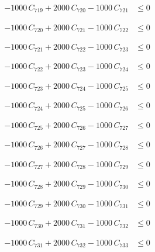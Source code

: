 \documentclass[a4paper,11pt]{article}
\begin{document}
\begin{align}
-1000\,C_{719} + 2000\,C_{720} - 1000\,C_{721} &\leq 0 \nonumber
\end{align}

\begin{align}
-1000\,C_{720} + 2000\,C_{721} - 1000\,C_{722} &\leq 0 \nonumber
\end{align}

\begin{align}
-1000\,C_{721} + 2000\,C_{722} - 1000\,C_{723} &\leq 0 \nonumber
\end{align}

\begin{align}
-1000\,C_{722} + 2000\,C_{723} - 1000\,C_{724} &\leq 0 \nonumber
\end{align}

\begin{align}
-1000\,C_{723} + 2000\,C_{724} - 1000\,C_{725} &\leq 0 \nonumber
\end{align}

\begin{align}
-1000\,C_{724} + 2000\,C_{725} - 1000\,C_{726} &\leq 0 \nonumber
\end{align}

\begin{align}
-1000\,C_{725} + 2000\,C_{726} - 1000\,C_{727} &\leq 0 \nonumber
\end{align}

\begin{align}
-1000\,C_{726} + 2000\,C_{727} - 1000\,C_{728} &\leq 0 \nonumber
\end{align}

\begin{align}
-1000\,C_{727} + 2000\,C_{728} - 1000\,C_{729} &\leq 0 \nonumber
\end{align}

\begin{align}
-1000\,C_{728} + 2000\,C_{729} - 1000\,C_{730} &\leq 0 \nonumber
\end{align}

\begin{align}
-1000\,C_{729} + 2000\,C_{730} - 1000\,C_{731} &\leq 0 \nonumber
\end{align}

\begin{align}
-1000\,C_{730} + 2000\,C_{731} - 1000\,C_{732} &\leq 0 \nonumber
\end{align}

\begin{align}
-1000\,C_{731} + 2000\,C_{732} - 1000\,C_{733} &\leq 0 \nonumber
\end{align}
\end{document}
